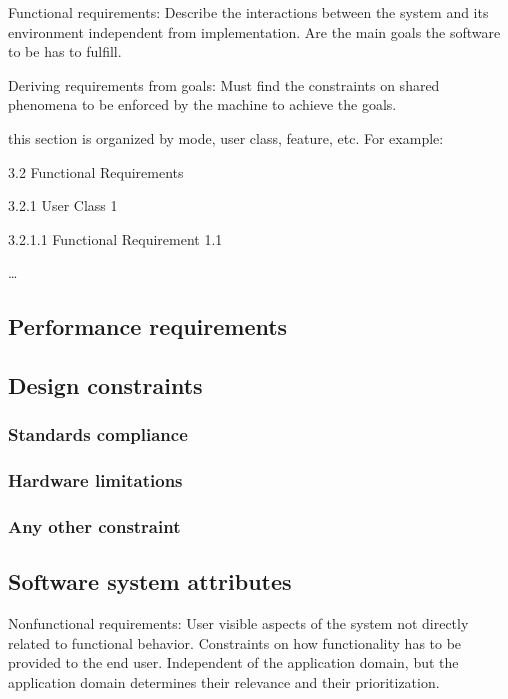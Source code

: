 Functional requirements: Describe the interactions between the system and its environment independent from implementation. Are the main goals the software to be has to fulfill.

Deriving requirements from goals: Must find the constraints on shared phenomena to be enforced by the machine to achieve the goals.

this section is organized by mode, user class, feature, etc. For example:

3.2 Functional Requirements

3.2.1 User Class 1

3.2.1.1 Functional Requirement 1.1

…

\subsection{Performance requirements}
\label{subsect:performancerequirements}

\subsection{Design constraints}
\label{subsect:designconstraints}

\subsubsection{Standards compliance}
\label{subsubsect:standardscompliance}

\subsubsection{Hardware limitations}
\label{subsubsect:hardwarelimitations}

\subsubsection{Any other constraint}
\label{subsubsect:anyotherconstraint}

\subsection{Software system attributes}
\label{subsect:softwaresystemattributes}

Nonfunctional requirements: User visible aspects of the system not directly related to functional behavior. 
Constraints on how functionality has to be provided to the end user.
Independent of the application domain, but the application domain determines their relevance and their prioritization.

